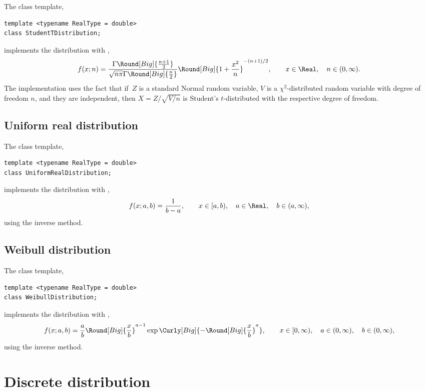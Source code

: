 The class template,
\begin{verbatim}
template <typename RealType = double>
class StudentTDistribution;
\end{verbatim}
implements the distribution with \pdf,
\begin{equation*}
  f(x;n) =
  \frac{\Gamma\Round[Big]{\frac{n + 1}{2}}}
  {\sqrt{n\pi}\Gamma\Round[Big]{\frac{n}{2}}}
  \Round[Big]{1 + \frac{x^2}{n}}^{-(n + 1)/2},\qquad
  x \in \Real,\quad n \in (0, \infty).
\end{equation*}
The implementation uses the fact that if~$Z$ is a standard Normal random
variable, $V$ is a $\chi^2$-distributed random variable with degree of freedom
$n$, and they are independent, then $X = Z/\sqrt{V / n}$ is Student's
$t$-distributed with the respective degree of freedom.

\subsection{Uniform real distribution}
\label{sub:Uniform real distribution}

The class template,
\begin{verbatim}
template <typename RealType = double>
class UniformRealDistribution;
\end{verbatim}
implements the distribution with \pdf,
\begin{equation*}
  f(x;a,b) = \frac{1}{b - a},\qquad
  x \in [a, b),\quad a \in \Real,\quad b \in (a, \infty),
\end{equation*}
using the inverse method.

\subsection{Weibull distribution}
\label{sub:Weibull distribution}

The class template,
\begin{verbatim}
template <typename RealType = double>
class WeibullDistribution;
\end{verbatim}
implements the distribution with \pdf,
\begin{equation*}
  f(x;a,b) = \frac{a}{b}\Round[Big]{\frac{x}{b}}^{a - 1}
  \exp\Curly[Big]{-\Round[Big]{\frac{x}{b}}^a},\qquad
  x \in [0, \infty),\quad a \in (0, \infty),\quad b \in (0, \infty),
\end{equation*}
using the inverse method.

\section{Discrete distribution}
\label{sec:Discrete distribution}

